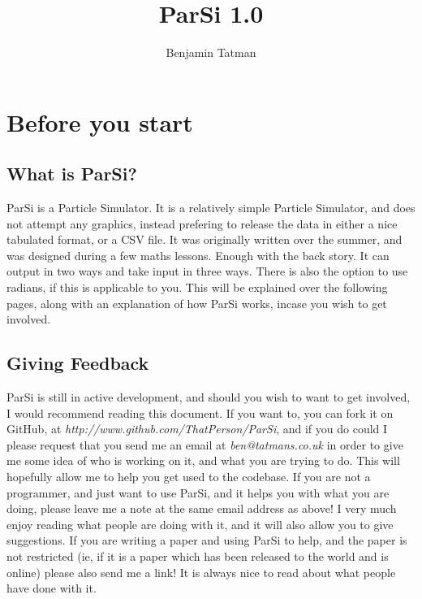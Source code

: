\documentclass[11pt]{article}
\title{\textbf{ParSi 1.0}}
\author{Benjamin Tatman}
\date{}
\begin{document}
\maketitle

\section{Before you start}
\subsection {What is ParSi?}
ParSi is a Particle Simulator. It is a relatively simple Particle Simulator, and does not attempt any graphics, instead prefering to release the data in either a nice tabulated format, or a CSV file. \newline
It was originally written over the summer, and was designed during a few maths lessons. Enough with the back story.\newline
It can output in two ways and take input in three ways. There is also the option to use radians, if this is applicable to you. This will be explained over the following pages, along with an explanation of how ParSi works, incase you wish to get involved.
\subsection {Giving Feedback}
ParSi is still in active development, and should you wish to want to get involved, I would recommend reading this document. If you want to, you can fork it on GitHub, at \emph{http://www.github.com/ThatPerson/ParSi}, and if you do could I please request that you send me an email at \emph{ben@tatmans.co.uk} in order to give me some idea of who is working on it, and what you are trying to do. This will hopefully allow me to help you get used to the codebase.\newline
If you are not a programmer, and just want to use ParSi, and it helps you with what you are doing, please leave me a note at the same email address as above! I very much enjoy reading what people are doing with it, and it will also allow you to give suggestions. If you are writing a paper and using ParSi to help, and the paper is not restricted (ie, if it is a paper which has been released to the world and is online) please also send me a link! It is always nice to read about what people have done with it.
\end{document}
